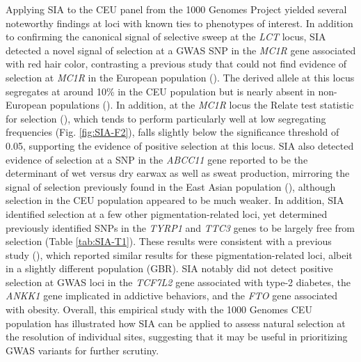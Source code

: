 Applying \ac{SIA} to the CEU panel from the 1000 Genomes Project yielded several noteworthy findings at loci with known ties to phenotypes of interest. In addition to confirming the canonical signal of selective sweep at the \textit{LCT} locus, \ac{SIA} detected a novel signal of selection at a \acs{GWAS} \acs{SNP} in the \textit{MC1R} gene associated with red hair color, contrasting a previous study that could not find evidence of selection at \textit{MC1R} in the European population (\cite{harding_evidence_2000}). The derived allele at this locus segregates at around 10\% in the CEU population but is nearly absent in non-European populations (\cite{marcus_visualizing_2017}). In addition, at the \textit{MC1R} locus the Relate test statistic for selection (\cite{speidel_method_2019}), which tends to perform particularly well at low segregating frequencies (Fig. \ref{fig:SIA-F2}), falls slightly below the significance threshold of 0.05, supporting the evidence of positive selection at this locus. \ac{SIA} also detected evidence of selection at a \acs{SNP} in the \textit{ABCC11} gene reported to be the determinant of wet versus dry earwax as well as sweat production, mirroring the signal of selection previously found in the East Asian population (\cite{ohashi_impact_2011}), although selection in the CEU population appeared to be much weaker. In addition, \ac{SIA} identified selection at a few other pigmentation-related loci, yet determined previously identified \acsp{SNP} in the \textit{TYRP1} and \textit{TTC3} genes to be largely free from selection (Table \ref{tab:SIA-T1}). These results were consistent with a previous study (\cite{stern_approximate_2019}), which reported similar results for these pigmentation-related loci, albeit in a slightly different population (GBR). \ac{SIA} notably did not detect positive selection at \acs{GWAS} loci in the \textit{TCF7L2} gene associated with type-2 diabetes, the \textit{ANKK1} gene implicated in addictive behaviors, and the \textit{FTO} gene associated with obesity. Overall, this empirical study with the 1000 Genomes CEU population has illustrated how \ac{SIA} can be applied to assess natural selection at the resolution of individual sites, suggesting that it may be useful in prioritizing \acs{GWAS} variants for further scrutiny.

